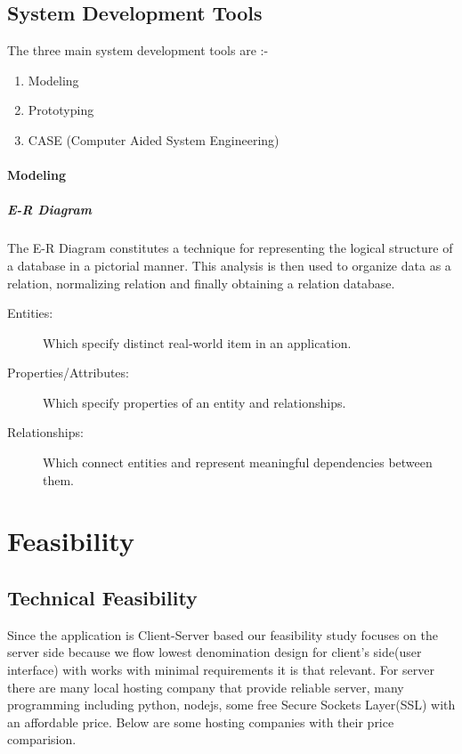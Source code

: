 \subsection{System Development Tools}
The three main system development tools are :-
\begin{enumerate}
	\item Modeling
	\item Prototyping
	\item CASE (Computer Aided System Engineering)
\end{enumerate}
\paragraph{Modeling}
\subparagraph{E-R Diagram}
The E-R Diagram constitutes a technique for representing the logical structure of a database in a pictorial manner. This analysis is then used to organize data as a relation, normalizing relation and finally obtaining a relation database.
\begin{description}
	\item[Entities:] Which specify distinct real-world item in an application.
	\item[Properties/Attributes:] Which specify properties of an entity and relationships.
	\item[Relationships:] Which connect entities and represent meaningful dependencies between them.
\end{description}
	
\section{Feasibility}

\subsection{Technical Feasibility}
Since the application is Client-Server based our feasibility study focuses on the server side because we flow lowest denomination design for client's side(user interface) with works with minimal requirements it is that relevant. For server there are many local hosting company that provide reliable server, many programming including python, nodejs, some free Secure Sockets Layer(SSL) with an affordable price. Below are some hosting companies with their price comparision.

